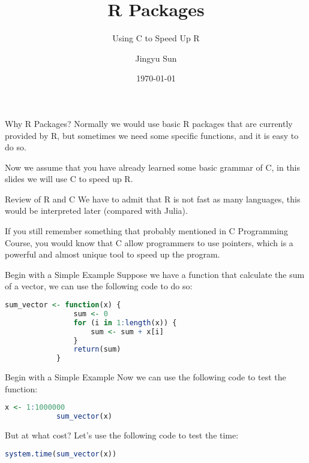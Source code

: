 \documentclass[aspectratio=169]{beamer}
\title{R Packages}
\subtitle{Using C to Speed Up R}
\date{\today}
\author{Jingyu Sun}
\institute{\small \emph{Ocean University of China, High Performance Computing Club, Qingdao 266100}}
\begin{document}
    \begin{frame}
        \titlepage
    \end{frame}

    \begin{frame}{Why R Packages?}
        Normally we would use basic R packages that are currently provided by R, but sometimes we need some specific functions, and it is easy to do so.\par
        Now we assume that you have already learned some basic grammar of C, in this slides we will use C to speed up R.\par
    \end{frame}

    \begin{frame}{Review of R and C}
        We have to admit that R is not fast as many languages, this would be interpreted later (compared with Julia).\par
        If you still remember something that probably mentioned in C Programming Course, you would know that C allow programmers to use pointers, which is a powerful and almost unique tool to speed up the program.\par
    \end{frame}

    \begin{frame}[fragile]{Begin with a Simple Example}
        Suppose we have a function that calculate the sum of a vector, we can use the following code to do so:\par
        \begin{lstlisting}[language=R]
            sum_vector <- function(x) {
                sum <- 0
                for (i in 1:length(x)) {
                    sum <- sum + x[i]
                }
                return(sum)
            }
        \end{lstlisting}
    \end{frame}

    \begin{frame}[fragile]{Begin with a Simple Example}
        Now we can use the following code to test the function:\par
        \begin{lstlisting}[language=R]
            x <- 1:1000000
            sum_vector(x)
        \end{lstlisting}
        But at what cost? Let's use the following code to test the time:\par
        \begin{lstlisting}[language=R]
            system.time(sum_vector(x))
        \end{lstlisting}
    \end{frame}
\end{document}

